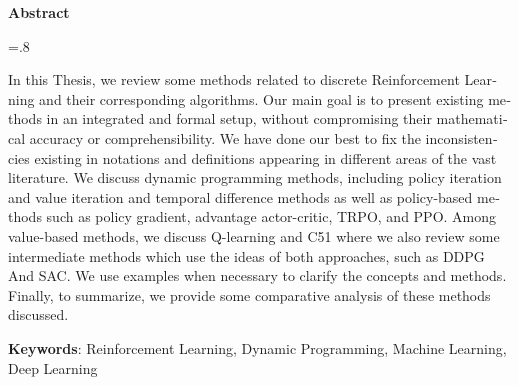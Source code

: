 


\pagestyle{empty}

\begin{latin}

\begin{center}
\textbf{Abstract}
\end{center}
\baselineskip=.8\baselineskip

In this Thesis, we review some methods related to discrete Reinforcement Learning and their corresponding algorithms.		
Our main goal is to present existing methods in an integrated and formal setup, without compromising their mathematical accuracy or comprehensibility.
We have done our best to fix the inconsistencies existing in notations and definitions appearing in different areas of the vast literature.
We discuss dynamic programming methods, including policy iteration and value iteration and temporal difference methods as well as policy-based methods such as policy gradient, advantage actor-critic, TRPO, and PPO. Among value-based methods, we discuss Q-learning and C51 where we also review some intermediate methods which use the ideas of both approaches, such as DDPG And SAC. We use examples when necessary to clarify the concepts and methods. Finally, to summarize, we provide some comparative analysis of these methods discussed.

\bigskip\noindent\textbf{Keywords}:
Reinforcement Learning, Dynamic Programming, Machine Learning, Deep Learning

\end{latin}

\newpage
